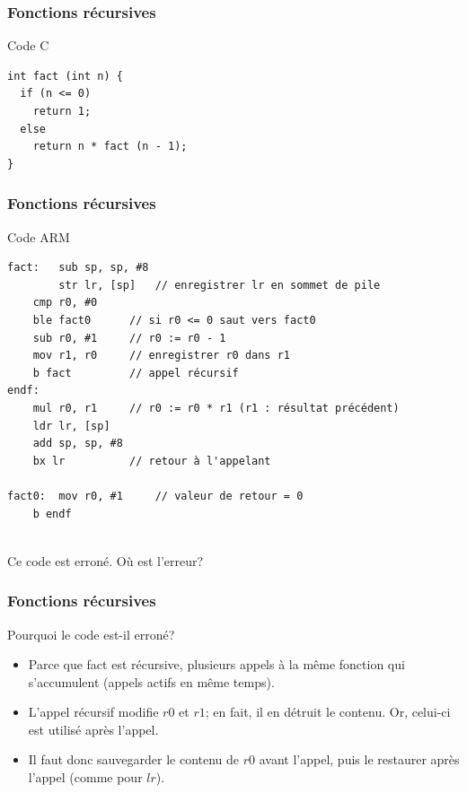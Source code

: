 \documentclass{beamer}
\begin{document}
\begin{frame}[fragile]
\frametitle{Fonctions récursives}

\begin{block}{Code C}
{\small
\begin{lstlisting}[style=C]
int fact (int n) {
  if (n <= 0)
    return 1;
  else
    return n * fact (n - 1);
}
\end{lstlisting}}
\end{block}
\end{frame}

\begin{frame}[fragile]
\frametitle{Fonctions récursives}

\begin{block}{Code ARM}
{\footnotesize
\begin{lstlisting}[style=arm]
fact:	sub sp, sp, #8
        str lr, [sp]   // enregistrer lr en sommet de pile
	cmp r0, #0
	ble fact0      // si r0 <= 0 saut vers fact0
	sub r0, #1     // r0 := r0 - 1
	mov r1, r0     // enregistrer r0 dans r1
	b fact         // appel récursif
endf:  	
	mul r0, r1     // r0 := r0 * r1 (r1 : résultat précédent)
	ldr lr, [sp]
	add sp, sp, #8
	bx lr          // retour à l'appelant
	
fact0:	mov r0, #1     // valeur de retour = 0
	b endf
	
\end{lstlisting}}

Ce code est erroné. Où est l'erreur?
\end{block}
\end{frame}

\begin{frame}
\frametitle{Fonctions récursives}

\begin{block}{Pourquoi le code est-il erroné?}
\begin{itemize}
\item Parce que fact est récursive, plusieurs appels à la même
  fonction qui s'accumulent (appels actifs en même temps).

\item L'appel récursif modifie $r0$ et $r1$; en fait, il en détruit le
  contenu. Or, celui-ci est utilisé après l'appel.

\item Il faut donc sauvegarder le contenu de $r0$ avant l'appel, puis
  le restaurer après l'appel (comme pour $lr$).
\end{itemize}
\end{block}
\end{frame}
\end{document}
